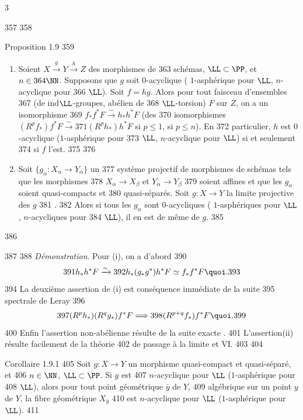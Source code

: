3	\documentclass[10pt]{../fichiers-configuration-latex/smfart}
\begin{document}
   357	
   358	\begin{enonce*}{Proposition 1.9}
   359	\begin{enumerate}
   360	\renewcommand{\theenumi}{\roman{enumi}}
   361	\renewcommand{\labelenumi}{(\theenumi)}
   362	\item Soient $X\xrightarrow{g}Y\xrightarrow{h}Z$ des morphismes de
   363	schémas, $\LL\subset \PP$, et $n\in
   364	\NN$. Supposons que $g$ soit $0$-acyclique (	$1$-asphérique pour $\LL$, \resp $n$-acyclique pour
   366	$\LL$). Soit $f=hg$. Alors pour tout faisceau d'ensembles
   367	(\resp de ind\sisi{-}{ }$\LL$-groupes, \resp abélien de
   368	$\LL$-torsion) $F$ sur $Z$, on a un isomorphisme
   369	$f_{\ast}f^{\ast}F\xrightarrow{\sim} h_{\ast}h^{\ast}F$ (\resp des
   370	isomorphismes $(R^{p}f_{\ast})f^{\ast}F\xrightarrow{\sim}
   371	(R^{p}h_{\ast})h^{\ast}F$ si $p\leq 1$, \resp si $p\leq n$). En
   372	particulier, $h$ est $0$-acyclique (\resp $1$-asphérique pour
   373	$\LL$, \resp $n$-acyclique pour $\LL$) si et seulement
   374	si $f$ l'est.
   375	
   376	\item Soit $\{g_{\alpha}:X_{\alpha}\rightarrow Y_{\alpha}\}$ un
   377	système projectif de morphismes de schémas tels que les morphismes
   378	$X_{\alpha}\rightarrow X_{\beta}$ et $Y_{\alpha}\rightarrow Y_{\beta}$
   379	soient affines et que les $g_{\alpha}$ soient quasi-compacts et
   380	quasi-séparés. Soit $g:X\rightarrow Y$ la limite projective des $g$
   381	.
   382	Alors si tous les $g_{\alpha}$ sont $0$-acycliques (	$1$-asphériques pour $\LL$, \resp $n$-acycliques pour
   384	$\LL$), il en est de même de $g$.
   385	\end{enumerate}
   386	\end{enonce*}
   387	
   388		\emph{Démonstration}. Pour (i), on a d'abord
   390	$$
   391	h_{\ast}h^{\ast}F\xrightarrow{\sim}
   392	h_{\ast}(g_{\ast}g^{\ast})h^{\ast}F\simeq f_{\ast}f^{\ast}F{\quoi}.
   393	$$
   394	La deuxième assertion de (i) est conséquence immédiate de la suite
   395	spectrale de Leray
   396	$$
   397	(R^{p}h_{\ast})(R^{q}g_{\ast})f^{\ast}F\Longrightarrow
   398	(R^{p+q}f_{\ast})f^{\ast}F{\quoi}.
   399	$$
   400	Enfin l'assertion non-abélienne résulte de la suite exacte .
   401	L'assertion\pageoriginale (ii) résulte facilement de la théorie
   402	de passage à la limite  et VI. %
   403	
   404	\begin{enonce*}{Corollaire 1.9.1}
   405	Soit $g:X\rightarrow Y$ un morphisme quasi-compact et quasi-séparé, et
   406	$n\in \NN$, $\LL\subset \PP$. Si $g$ est
   407	$n$-acyclique pour $\LL$ (\resp $1$-asphérique pour
   408	$\LL$), alors pour tout point géométrique $\bar{y}$ de $Y$,
   409	algébrique sur un point $y$ de $Y$, la fibre géométrique $X_{\bar{y}}$
   410	est $n$-acyclique pour $\LL$ (\resp $1$-asphérique pour $\LL$).
   411	\end{enonce*}
\end{document}
